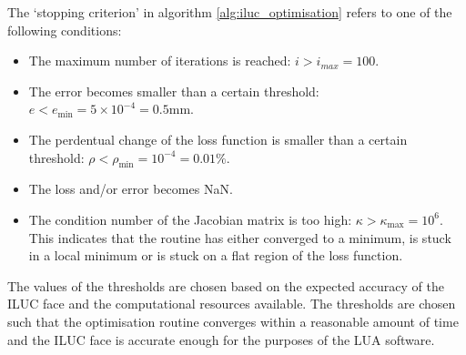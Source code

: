 The `stopping criterion' in algorithm \ref{alg:iluc_optimisation} refers to one of the following conditions:
\begin{itemize}
    \item The maximum number of iterations is reached: $i > i_{max} = 100$.
    \item The error becomes smaller than a certain threshold: $e < e_{\text{min}} = 5\times10^{-4} = 0.5 \text{mm}$.
    \item The perdentual change of the loss function is smaller than a certain threshold: $\rho < \rho_{\text{min}} = 10^{-4} = 0.01\%$.
    \item The loss and/or error becomes NaN.
    \item The condition number of the Jacobian matrix is too high: $\kappa > \kappa_{\text{max}} = 10^6$. This indicates that the routine has either converged to a minimum, is stuck in a local minimum or is stuck on a flat region of the loss function.
\end{itemize}
The values of the thresholds are chosen based on the expected accuracy of the ILUC face and the computational resources available. The thresholds are chosen such that the optimisation routine converges within a reasonable amount of time and the ILUC face is accurate enough for the purposes of the LUA software.

